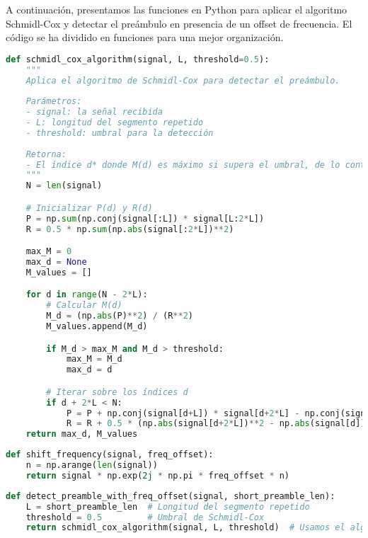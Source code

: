 \documentclass[letterpaper,12pt,oneside]{article}
\begin{document}
A continuación, presentamos las funciones en Python para aplicar el algoritmo Schmidl-Cox y detectar el preámbulo en presencia de un offset de frecuencia. El código se ha dividido en funciones para una mejor organización.

\begin{tcolorbox}[title=\textbf{Función 1: Algoritmo Schmidl-Cox}]
\begin{lstlisting}[language=Python]
def schmidl_cox_algorithm(signal, L, threshold=0.5):
    """
    Aplica el algoritmo de Schmidl-Cox para detectar el preámbulo.
    
    Parámetros:
    - signal: la señal recibida
    - L: longitud del segmento repetido
    - threshold: umbral para la detección
    
    Retorna:
    - El índice d* donde M(d) es máximo si supera el umbral, de lo contrario, None.
    """
    N = len(signal)

    # Inicializar P(d) y R(d)
    P = np.sum(np.conj(signal[:L]) * signal[L:2*L])
    R = 0.5 * np.sum(np.abs(signal[:2*L])**2)

    max_M = 0
    max_d = None
    M_values = []

    for d in range(N - 2*L):
        # Calcular M(d)
        M_d = (np.abs(P)**2) / (R**2)
        M_values.append(M_d)

        if M_d > max_M and M_d > threshold:
            max_M = M_d
            max_d = d

        # Iterar sobre los índices d
        if d + 2*L < N:
            P = P + np.conj(signal[d+L]) * signal[d+2*L] - np.conj(signal[d]) * signal[d+L]
            R = R + 0.5 * (np.abs(signal[d+2*L])**2 - np.abs(signal[d])**2)
    return max_d, M_values
\end{lstlisting}
\end{tcolorbox}

\vspace{0.5cm}
\begin{tcolorbox}[title=\textbf{Función 2: Desplazamiento de Frecuencia}]
\begin{lstlisting}[language=Python]
def shift_frequency(signal, freq_offset):
    n = np.arange(len(signal))
    return signal * np.exp(2j * np.pi * freq_offset * n)
\end{lstlisting}
\end{tcolorbox}

\vspace{0.5cm}
\begin{tcolorbox}[title=\textbf{Función 3: Detección de Preambulo con Offset de Frecuencia}]
\begin{lstlisting}[language=Python]
def detect_preamble_with_freq_offset(signal, short_preamble_len):
    L = short_preamble_len  # Longitud del segmento repetido
    threshold = 0.5         # Umbral de Schmidl-Cox
    return schmidl_cox_algorithm(signal, L, threshold)  # Usamos el algoritmo implementado previamente
\end{lstlisting}
\end{tcolorbox}
\end{document}
